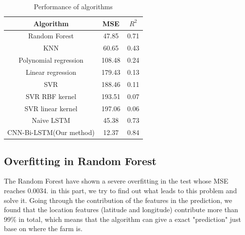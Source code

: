 \documentclass[conference, a4paper]{IEEEtran}
\begin{document}
  \begin{table}[htbp]
    \caption{Performance of algorithms}
    \begin{center}
    \begin{tabular}{|c|c|c|}
    \hline
    Algorithm                                    & MSE      & $R^2$\\
    \hline
    Random Forest \cite{liawClassificationRegressionRandomForest2002}                      &    47.85  & 0.71\\
    KNN \cite{petersonKnearestNeighbor2009}                                         & 60.65 & 0.43\\
    Polynomial regression & 108.48 & 0.24\\
    Linear regression   & 179.43 & 0.13\\
    SVR \cite{druckerSupportVectorRegression1997}                                     & 188.46 & 0.11\\
    SVR RBF kernel \cite{cristianiniIntroductionSupportVector2000}                         & 193.51 & 0.07\\
    SVR linear kernel \cite{cristianiniIntroductionSupportVector2000}                      & 197.06 & 0.06\\
    \hline
    Naive LSTM    & 45.38    &  0.73\\
    CNN-Bi-LSTM(Our method) & 12.37 & 0.84\\
    \hline
    \end{tabular}
    \label{tab:result}
    \end{center}
  \end{table}


\subsection{Overfitting in Random Forest} \label{sec:ovf}
  The Random Forest have shown a severe overfitting in the test whose MSE reaches 0.0034. in this part, we try to find out what leads to this problem and solve it. Going through the contribution of the features in the prediction, we found that the location features (latitude and longitude) contribute more than 99\% in total, which means that the algorithm can give a exact "prediction" just base on where the farm is.
\end{document}
